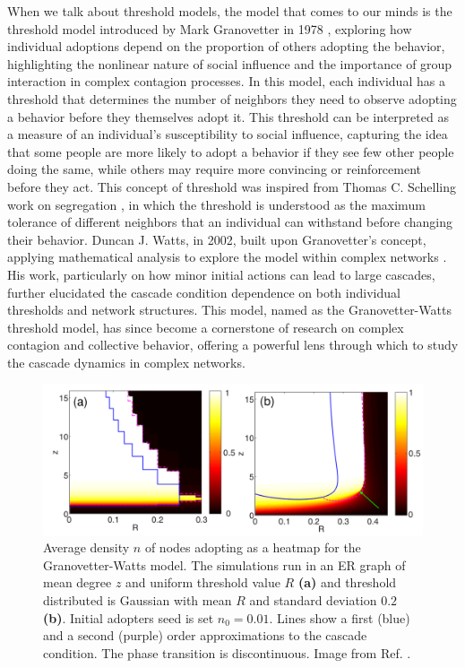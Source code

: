 When we talk about threshold models, the model that comes to our minds is the threshold model introduced by Mark Granovetter in 1978 \cite{granovetter-1978}, exploring how individual adoptions depend on the proportion of others adopting the behavior, highlighting the nonlinear nature of social influence and the importance of group interaction in complex contagion processes. In this model, each individual has a threshold that determines the number of neighbors they need to observe adopting a behavior before they themselves adopt it. This threshold can be interpreted as a measure of an individual's susceptibility to social influence, capturing the idea that some people are more likely to adopt a behavior if they see few other people doing the same, while others may require more convincing or reinforcement before they act. This concept of threshold was inspired from Thomas C. Schelling work on segregation \cite{schelling-1969}, in which the threshold is understood as the maximum tolerance of different neighbors that an individual can withstand before changing their behavior. Duncan J. Watts, in 2002, built upon Granovetter's concept, applying mathematical analysis to explore the model within complex networks \cite{watts-2002}. His work, particularly on how minor initial actions can lead to large cascades, further elucidated the cascade condition dependence on both individual thresholds and network structures. This model, named as the Granovetter-Watts threshold model, has since become a cornerstone of research on complex contagion and collective behavior, offering a powerful lens through which to study the cascade dynamics in complex networks.

\begin{figure}
    \centering
    \captionsetup{font=sf}
    \includegraphics[width=\textwidth]{Figs/Introduction/cascade_gleeson.pdf}
    \caption[Cascade diagram of the Granovetter-Watts model]{Average density $n$ of nodes adopting as a heatmap for the Granovetter-Watts model. The simulations run in an ER graph of mean degree $z$ and uniform threshold value $R$  \textbf{(a)} and threshold distributed is Gaussian with mean $R$ and standard deviation $0.2$ \textbf{(b)}. Initial adopters seed is set $n_0 = 0.01$. Lines show a first (blue) and a second (purple) order approximations to the cascade condition. The phase transition is discontinuous. Image from Ref. \cite{gleeson-2007}.}
    \label{fig:Cascade_gleeson}
\end{figure}

